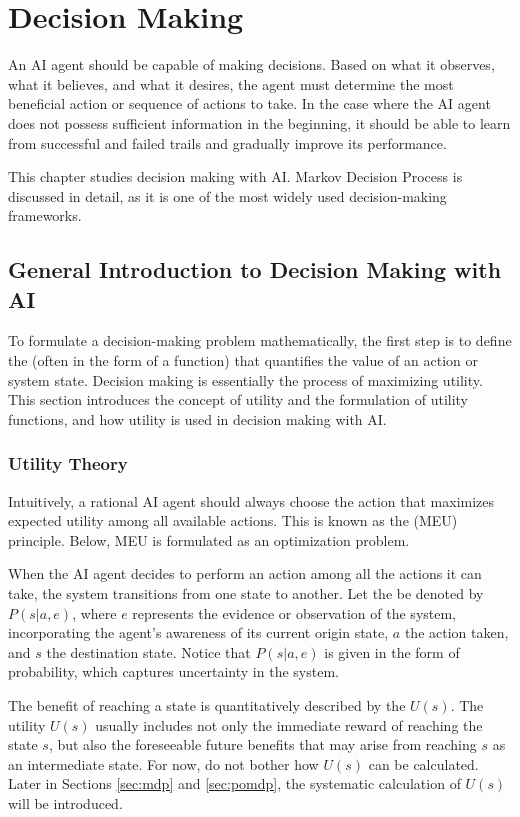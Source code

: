 \chapter{Decision Making}

An AI agent should be capable of making decisions. Based on what it observes, what it believes, and what it desires, the agent must determine the most beneficial action or sequence of actions to take. In the case where the AI agent does not possess sufficient information in the beginning, it should be able to learn from successful and failed trails and gradually improve its performance.

This chapter studies decision making with AI. Markov Decision Process is discussed in detail, as it is one of the most widely used decision-making frameworks.

\section{General Introduction to Decision Making with AI}

To formulate a decision-making problem mathematically, the first step is to define the  (often in the form of a function) that quantifies the value of an action or system state. Decision making is essentially the process of maximizing utility. This section introduces the concept of utility and the formulation of utility functions, and how utility is used in decision making with AI.

\subsection{Utility Theory}

Intuitively, a rational AI agent should always choose the action that maximizes expected utility among all available actions. This is known as the  (MEU) principle. Below, MEU is formulated as an optimization problem.

When the AI agent decides to perform an action among all the actions it can take, the system transitions from one state to another. Let the  be denoted by $P(s|a,e)$, where $e$ represents the evidence or observation of the system, incorporating the agent’s awareness of its current origin state, $a$ the action taken, and $s$ the destination state. Notice that $P(s|a,e)$ is given in the form of probability, which captures uncertainty in the system.

The benefit of reaching a state is quantitatively described by the  $U(s)$. The utility $U(s)$ usually includes not only the immediate reward of reaching the state $s$, but also the foreseeable future benefits that may arise from reaching $s$ as an intermediate state. For now, do not bother how $U(s)$ can be calculated. Later in Sections \ref{sec:mdp} and \ref{sec:pomdp}, the systematic calculation of $U(s)$ will be introduced.


